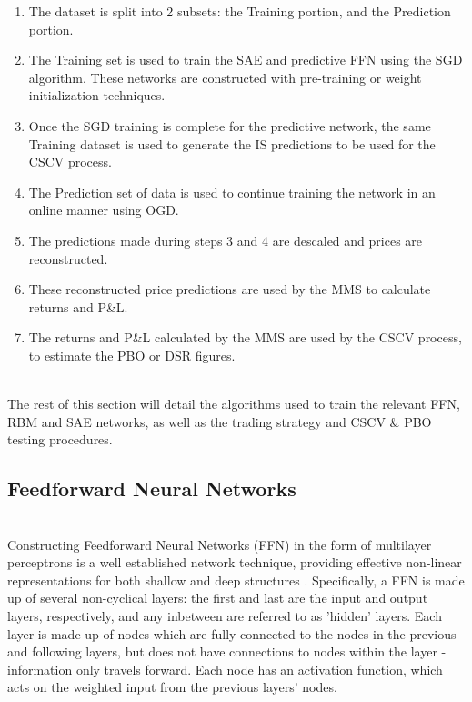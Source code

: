 \documentclass[a4paper,11pt,oneside]{article}
\theoremstyle{plain}
\theoremstyle{definition}
\begin{document}
	\begin{enumerate}
		\item The dataset is split into 2 subsets: the Training portion, and the Prediction portion.
		\item The Training set is used to train the SAE and predictive FFN using the SGD algorithm. These networks are constructed with pre-training or weight initialization techniques.
		\item Once the SGD training is complete for the predictive network, the same Training dataset is used to generate the IS predictions to be used for the CSCV process.
		\item The Prediction set of data is used to continue training the network in an online manner using OGD.
		\item The predictions made during steps 3 and 4 are descaled and prices are reconstructed.
		\item These reconstructed price predictions are used by the MMS to calculate returns and P\&L.
		\item The returns and P\&L calculated by the MMS are used by the CSCV process, to estimate the PBO or DSR figures.
	\end{enumerate}
	~\\
	The rest of this section will detail the algorithms used to train the relevant FFN, RBM and SAE networks, as well as the trading strategy and CSCV \& PBO testing procedures.
	
	\subsection{Feedforward Neural Networks}\label{imp_ffn}
	~\\
	Constructing Feedforward Neural Networks (FFN) in the form of multilayer perceptrons is a well established network technique, providing effective non-linear representations for both shallow and deep structures \citep{Schmidhuber}. Specifically, a FFN is made up of several non-cyclical layers: the first and last are the input and output layers, respectively, and any inbetween are referred to as 'hidden' layers. Each layer is made up of nodes which are fully connected to the nodes in the previous and following layers, but does not have connections to nodes within the layer - information only travels forward. Each 
	node has an activation function, which acts on the weighted input from the previous layers' nodes.
	
\end{document}

